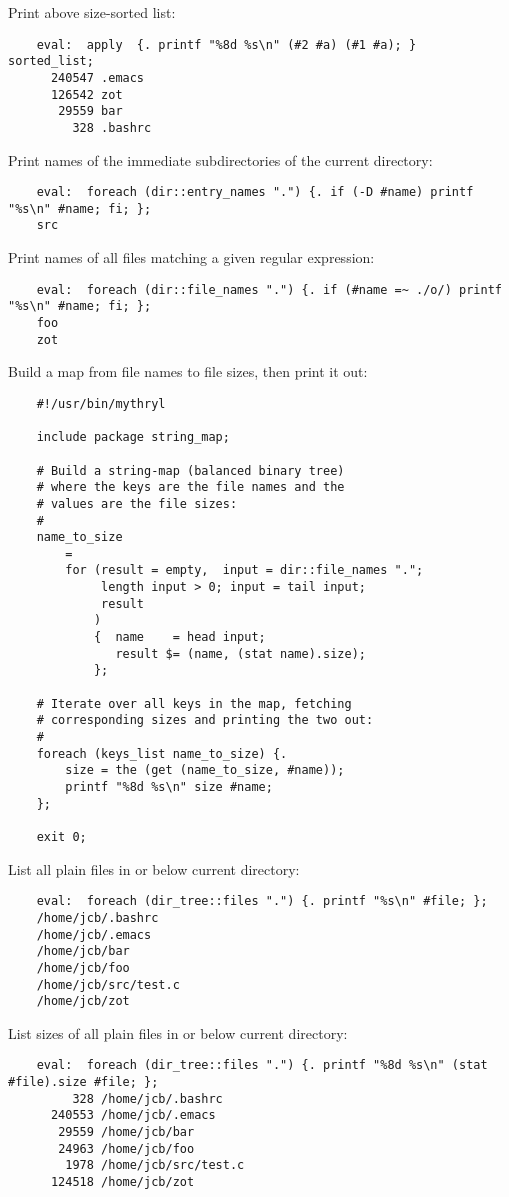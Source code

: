 Print above size-sorted list:
\begin{verbatim}
    eval:  apply  {. printf "%8d %s\n" (#2 #a) (#1 #a); }  sorted_list;
      240547 .emacs
      126542 zot
       29559 bar
         328 .bashrc
\end{verbatim}

Print names of the immediate subdirectories of the current directory:
\begin{verbatim}
    eval:  foreach (dir::entry_names ".") {. if (-D #name) printf "%s\n" #name; fi; };
    src
\end{verbatim}

Print names of all files matching a given regular expression:
\begin{verbatim}
    eval:  foreach (dir::file_names ".") {. if (#name =~ ./o/) printf "%s\n" #name; fi; };
    foo
    zot
\end{verbatim}

Build a map from file names to file sizes, then print it out:
\begin{verbatim}
    #!/usr/bin/mythryl

    include package string_map;

    # Build a string-map (balanced binary tree)
    # where the keys are the file names and the
    # values are the file sizes:
    #
    name_to_size
        =
        for (result = empty,  input = dir::file_names ".";
             length input > 0; input = tail input;
             result
            )
            {  name    = head input;
               result $= (name, (stat name).size);
            };

    # Iterate over all keys in the map, fetching
    # corresponding sizes and printing the two out:
    #
    foreach (keys_list name_to_size) {.
        size = the (get (name_to_size, #name));
        printf "%8d %s\n" size #name;
    };

    exit 0;
\end{verbatim}


List all plain files in or below current directory:
\begin{verbatim}
    eval:  foreach (dir_tree::files ".") {. printf "%s\n" #file; };
    /home/jcb/.bashrc
    /home/jcb/.emacs
    /home/jcb/bar
    /home/jcb/foo
    /home/jcb/src/test.c
    /home/jcb/zot
\end{verbatim}

List sizes of all plain files in or below current directory:
\begin{verbatim}
    eval:  foreach (dir_tree::files ".") {. printf "%8d %s\n" (stat #file).size #file; };
         328 /home/jcb/.bashrc
      240553 /home/jcb/.emacs
       29559 /home/jcb/bar
       24963 /home/jcb/foo
        1978 /home/jcb/src/test.c
      124518 /home/jcb/zot
\end{verbatim}


